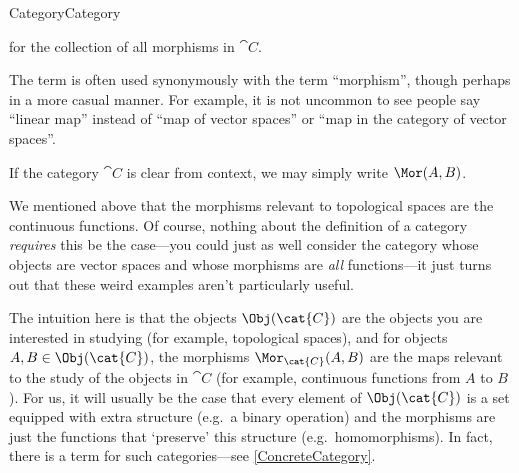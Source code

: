 \begin{dfn}{Category}{Category}
\begin{rmk}
for the collection of all morphisms in $\cat{C}$.
\end{rmk}
\begin{rmk}
The term  is often used synonymously with the term ``morphism'', though perhaps in a more casual manner.  For example, it is not uncommon to see people say ``linear map'' instead of ``map of vector spaces'' or ``map in the category of vector spaces''.
\end{rmk}
\begin{rmk}
If the category $\cat{C}$ is clear from context, we may simply write $\Mor (A,B)$.
\end{rmk}
\begin{rmk}	We mentioned above that the morphisms relevant to topological spaces are the continuous functions.  Of course, nothing about the definition of a category \emph{requires} this be the case---you could just as well consider the category whose objects are vector spaces and whose morphisms are \emph{all} functions---it just turns out that these weird examples aren't particularly useful.
\end{rmk}
\end{dfn}
The intuition here is that the objects $\Obj (\cat{C})$ are the objects you are interested in studying (for example, topological spaces), and for objects $A,B\in \Obj (\cat{C})$, the morphisms $\Mor _{\cat{C}}(A,B)$ are the maps relevant to the study of the objects in $\cat{C}$ (for example, continuous functions from $A$ to $B$).  For us, it will usually be the case that every element of $\Obj (\cat{C})$ is a set equipped with extra structure (e.g.~a binary operation) and the morphisms are just the functions that `preserve' this structure (e.g.~homomorphisms).  In fact, there is a term for such categories---see \cref{ConcreteCategory}.


